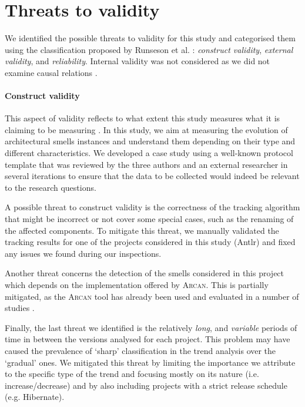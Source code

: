
\section{Threats to validity}\label{c3:sec:threats}
We identified the possible threats to validity for this study and categorised them using the classification proposed by Runseson et al. \cite{Runeson2012}: \emph{construct validity}, \emph{external validity}, and \emph{reliability}.
Internal validity was not considered as we did not examine causal relations \cite{Runeson2012}.

\paragraph{Construct validity}
This aspect of validity reflects to what extent this study measures what it is claiming to be measuring \cite{Runeson2012}.
In this study, we aim at measuring the evolution of architectural smells instances and understand them depending on their type and different characteristics.
We developed a case study using a well-known protocol template \cite{Brereton2008} that was reviewed by the three authors and an external researcher in several iterations to ensure that the data to be collected would indeed be relevant to the research questions.

A possible threat to construct validity  is the correctness of the tracking algorithm that might be incorrect or not cover some special cases, such as the renaming of the affected components.
To mitigate this threat, we manually validated the tracking results for one of the projects considered in this study (Antlr) and fixed any issues we found during our inspections.

Another threat concerns the detection of the smells considered in this project which depends on the implementation offered by \textsc{Arcan}. This is partially mitigated, as the \textsc{Arcan} tool has already been used and evaluated in a number of studies \cite{Arcelli2016, Biaggi2018}.

Finally, the last threat we identified is the relatively \emph{long}, and \emph{variable} periods of time in between the versions analysed for each project. This problem may have caused the prevalence of `sharp' classification in the trend analysis over the `gradual' ones.
We mitigated this threat by limiting the importance we attribute to the specific type of the trend and focusing mostly on its nature (i.e. increase/decrease) and by also including projects with a strict release schedule (e.g. Hibernate).

